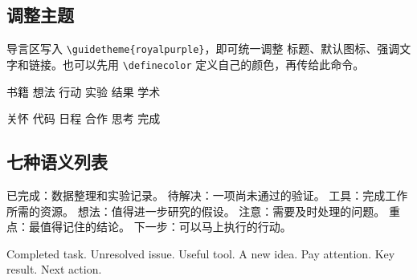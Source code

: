 \documentclass[11pt,a4paper,fontset=fandol]{ctexart}
\begin{document}
\subsection{调整主题}
导言区写入 \texttt{\textbackslash guidetheme\{royalpurple\}}，即可统一调整
标题、默认图标、强调文字和链接。也可以先用
\texttt{\textbackslash definecolor} 定义自己的颜色，再传给此命令。

\clearpage
{}
 书籍\quad {} 想法\quad
{} 行动\quad {} 实验\quad
{} 结果\quad {} 学术

 关怀\quad {} 代码\quad
{} 日程\quad {} 合作\quad
{} 思考\quad {} 完成
\begin{texcode}
\end{texcode}
\subsection{七种语义列表}
\begin{itemize}
  \gooditem 已完成：数据整理和实验记录。
  \baditem 待解决：一项尚未通过的验证。
  \toolitem 工具：完成工作所需的资源。
  \ideaitem 想法：值得进一步研究的假设。
  \warningitem 注意：需要及时处理的问题。
  \staritem 重点：最值得记住的结论。
  \arrowitem 下一步：可以马上执行的行动。
\end{itemize}
\begin{texcode}
\begin{itemize}
  \gooditem Completed task.
  \baditem Unresolved issue.
  \toolitem Useful tool.
  \ideaitem A new idea.
  \warningitem Pay attention.
  \staritem Key result.
  \arrowitem Next action.
\end{itemize}
\end{texcode}
\end{document}
